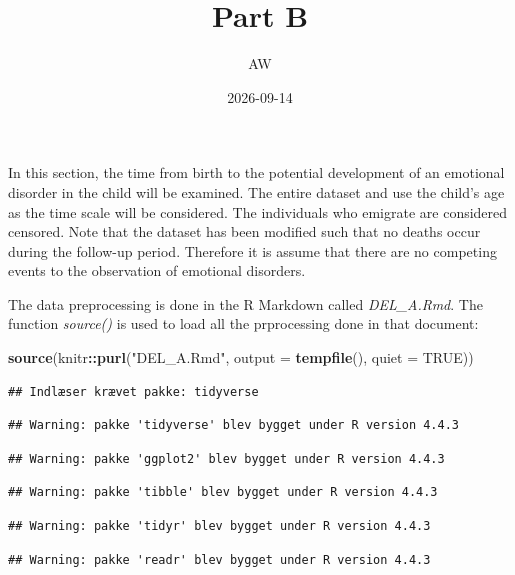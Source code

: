 \documentclass[
]{article}
\title{Part B}
\author{AW}
\date{2026-09-14}
\newenvironment{Shaded}{\begin{snugshade}}{\end{snugshade}}
\newcommand{\AttributeTok}[1]{\textcolor[rgb]{0.13,0.29,0.53}{#1}}
\newcommand{\ConstantTok}[1]{\textcolor[rgb]{0.56,0.35,0.01}{#1}}
\newcommand{\FunctionTok}[1]{\textcolor[rgb]{0.13,0.29,0.53}{\textbf{#1}}}
\newcommand{\NormalTok}[1]{#1}
\newcommand{\SpecialCharTok}[1]{\textcolor[rgb]{0.81,0.36,0.00}{\textbf{#1}}}
\newcommand{\StringTok}[1]{\textcolor[rgb]{0.31,0.60,0.02}{#1}}
\begin{document}
\maketitle

In this section, the time from birth to the potential development of an
emotional disorder in the child will be examined. The entire dataset and
use the child's age as the time scale will be considered. The
individuals who emigrate are considered censored. Note that the dataset
has been modified such that no deaths occur during the follow-up period.
Therefore it is assume that there are no competing events to the
observation of emotional disorders.

The data preprocessing is done in the R Markdown called
\emph{DEL\_A.Rmd}. The function \emph{source()} is used to load all the
prprocessing done in that document:

\begin{Shaded}
\begin{Highlighting}[]
\FunctionTok{source}\NormalTok{(knitr}\SpecialCharTok{::}\FunctionTok{purl}\NormalTok{(}\StringTok{"DEL\_A.Rmd"}\NormalTok{, }
                   \AttributeTok{output =} \FunctionTok{tempfile}\NormalTok{(), }\AttributeTok{quiet =} \ConstantTok{TRUE}\NormalTok{))}
\end{Highlighting}
\end{Shaded}

\begin{verbatim}
## Indlæser krævet pakke: tidyverse
\end{verbatim}

\begin{verbatim}
## Warning: pakke 'tidyverse' blev bygget under R version 4.4.3
\end{verbatim}

\begin{verbatim}
## Warning: pakke 'ggplot2' blev bygget under R version 4.4.3
\end{verbatim}

\begin{verbatim}
## Warning: pakke 'tibble' blev bygget under R version 4.4.3
\end{verbatim}

\begin{verbatim}
## Warning: pakke 'tidyr' blev bygget under R version 4.4.3
\end{verbatim}

\begin{verbatim}
## Warning: pakke 'readr' blev bygget under R version 4.4.3
\end{verbatim}
\end{document}
